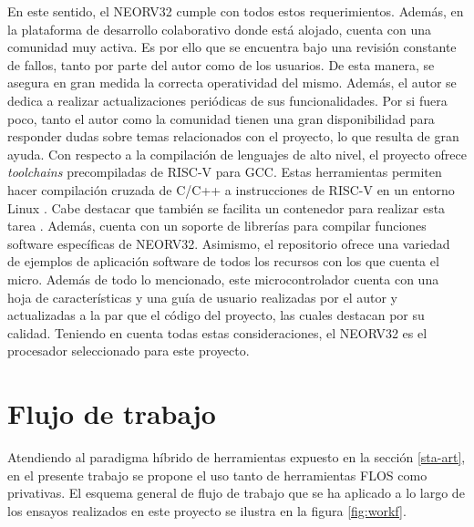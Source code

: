 En este sentido, el NEORV32 \cite{gh:neorv32} cumple con todos estos requerimientos. 
Además, en la plataforma de desarrollo colaborativo donde está alojado, cuenta con una comunidad muy activa.
Es por ello que se encuentra bajo una revisión constante de fallos, tanto por parte del autor como de los usuarios.
De esta manera, se asegura en gran medida la correcta operatividad del mismo.
Además, el autor se dedica a realizar actualizaciones periódicas de sus funcionalidades.
Por si fuera poco, tanto el autor como la comunidad tienen una gran disponibilidad para responder dudas sobre temas relacionados con el proyecto, lo que resulta de gran ayuda.
Con respecto a la compilación de lenguajes de alto nivel, el proyecto ofrece \textit{toolchains} precompiladas de RISC-V para GCC.  
Estas herramientas permiten hacer compilación cruzada de C/C++ a instrucciones de RISC-V  en un entorno Linux \cite{gh:neorv32-tool}.
Cabe destacar que también se facilita un contenedor para realizar esta tarea \cite{gh:sim-conatiner}. 
Además, cuenta con un soporte de librerías para compilar funciones software específicas de NEORV32. 
Asimismo, el repositorio ofrece una variedad de ejemplos de aplicación software de todos los recursos con los que cuenta el micro.
Además de todo lo mencionado, este microcontrolador cuenta con una hoja de características \cite{neorv32-ds} y una guía de usuario \cite{neorv32-ug} realizadas por el autor y actualizadas a la par que el código del proyecto, las cuales destacan por su calidad.
Teniendo en cuenta todas estas consideraciones, el NEORV32 es el procesador seleccionado para este proyecto.

\section{Flujo de trabajo}

\label{Workf}

Atendiendo al paradigma híbrido de herramientas expuesto en la sección \ref{sta-art}, en el presente trabajo se propone el uso tanto de herramientas FLOS como privativas.
El esquema general de flujo de trabajo que se ha aplicado a lo largo de los ensayos realizados en este proyecto se ilustra en la figura \ref{fig:workf}. 

